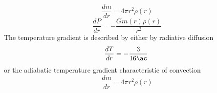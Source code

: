 \begin{equation}
    \frac{dm}{dr} = 4\pi r^2 \rho(r)
\end{equation}
\begin{equation}
    \frac{dP}{dr} = -\frac{G m(r)\rho(r)}{r^2}
\end{equation}
The temperature gradient is described by either by radiative diffusion
\begin{equation}
    \frac{dT}{dr} = -\frac{3}{16\ac}\frac{}{}
\end{equation}
or the adiabatic temperature gradient characteristic of convection
\begin{equation}
    \frac{dm}{dr} = 4\pi r^2 \rho(r)
\end{equation}